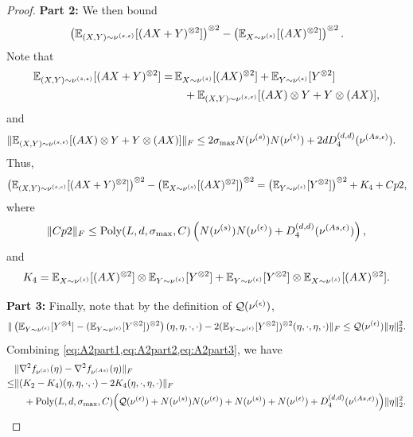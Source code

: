 \begin{proof}
	\vspace{5mm}
	{\bf Part 2:} We then bound 
	\[
	\left( \mathbb{E}_{(X,Y)\sim \nu^{(s,\epsilon)}} [(AX+Y)^{\otimes 2}]\right)^{\otimes2} - \left(\mathbb{E}_{X\sim \nu^{(s)}}[(AX)^{\otimes 2}]\right)^{\otimes2}.
	\]
	Note that
	\begin{align*}
	\mathbb{E}_{(X,Y)\sim \nu^{(s,\epsilon)}} [(AX+Y)^{\otimes 2}]= & \, \mathbb{E}_{X\sim \nu^{(s)}}[(AX)^{\otimes 2}] + \mathbb{E}_{Y\sim \nu^{(\epsilon)}}[Y^{\otimes 2}] \\
	& \quad + \mathbb{E}_{(X,Y)\sim \nu^{(s,\epsilon)}}[(AX)\otimes Y + Y\otimes (AX)],
	\end{align*}
	and 
	\begin{align*}
	& \|\mathbb{E}_{(X,Y)\sim \nu^{(s,\epsilon)}}[(AX)\otimes Y + Y\otimes (AX)]\|_F \le 2\sigma_{\max}N(\nu^{(s)})N(\nu^{(\epsilon)}) + 2dD_4^{(d,d)}(\nu^{(As,\epsilon)}).
	\end{align*}
	Thus, 
	\begin{equation}
	\label{eq:A2part2}
	\left( \mathbb{E}_{(X,Y)\sim \nu^{(s,\epsilon)}} [(AX+Y)^{\otimes 2}]\right)^{\otimes2} -  \left(\mathbb{E}_{X\sim \nu^{(s)}}[(AX)^{\otimes 2}]\right)^{\otimes2} 
	=  \left( \mathbb{E}_{Y\sim \nu^{(\epsilon)}}[Y^{\otimes 2}]\right)^{\otimes 2} + K_4+ Cp2,
	\end{equation}
	where 
	$$\|Cp2\|_F \le \text{Poly}(L, d, \sigma_{\max}, C)\left( N(\nu^{(s)})N(\nu^{(\epsilon)}) + D_4^{(d,d)}(\nu^{(As,\epsilon)}) \right), $$
	and 
	$$K_4 = \mathbb{E}_{X\sim \nu^{(s)}}[(AX)^{\otimes 2}] \otimes \mathbb{E}_{Y\sim \nu^{(\epsilon)}}[Y^{\otimes 2}] + \mathbb{E}_{Y\sim \nu^{(\epsilon)}}[Y^{\otimes 2}] \otimes \mathbb{E}_{X\sim \nu^{(s)}}[(AX)^{\otimes 2}].
	$$
	
	\vspace{5mm}
	{\bf Part 3:} Finally, note that by the definition of $\mathcal{Q}(\nu^{(\epsilon)}) $,
	\begin{equation}
	\label{eq:A2part3}
	\| \left(\mathbb{E}_{Y\sim \nu^{(\epsilon)}} [Y^{\otimes4}] - (\mathbb{E}_{Y\sim \nu^{(\epsilon)}} [Y^{\otimes2}])^{\otimes 2}\right)(\eta,\eta,\cdot,\cdot)  - 2 (\mathbb{E}_{Y\sim \nu^{(\epsilon)}} [Y^{\otimes2}])^{\otimes 2}(\eta,\cdot,\eta,\cdot)\|_F \le \mathcal{Q}(\nu^{(\epsilon)}) \|\eta\|_2^2.
	\end{equation}
	Combining \cref{eq:A2part1,eq:A2part2,eq:A2part3},  we have 
	\begin{align}
	& \|\nabla^2f_{\nu^{(x)}}(\eta) -  \nabla^2f_{\nu^{(As)}}(\eta) \|_F \nonumber\\ 
	\le & \|(K_2-K_4)(\eta,\eta,\cdot, \cdot) - 2K_4(\eta,\cdot,\eta,\cdot)\|_F \nonumber\\
	& \quad + \text{Poly}(L, d, \sigma_{\max}, C)\Big(\mathcal{Q}(\nu^{(\epsilon)}) + N(\nu^{(s)})N(\nu^{(\epsilon)}) + N(\nu^{(s)}) + N(\nu^{(\epsilon)})+ D_4^{(d,d)}(\nu^{(As,\epsilon)}) \Big) \|\eta\|_2^2. \label{eq:A2summary}
	\end{align}
	

\end{proof}
